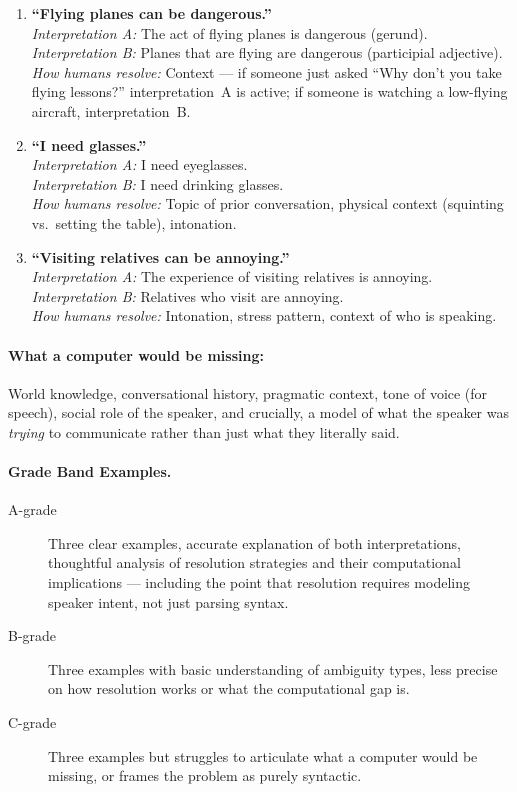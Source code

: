 \begin{enumerate}
    \item \textbf{``Flying planes can be dangerous.''}\\
    \emph{Interpretation A:} The act of flying planes is dangerous (gerund).\\
    \emph{Interpretation B:} Planes that are flying are dangerous (participial adjective).\\
    \emph{How humans resolve:} Context --- if someone just asked ``Why don't you take flying lessons?'' interpretation~A is active; if someone is watching a low-flying aircraft, interpretation~B.

    \item \textbf{``I need glasses.''}\\
    \emph{Interpretation A:} I need eyeglasses.\\
    \emph{Interpretation B:} I need drinking glasses.\\
    \emph{How humans resolve:} Topic of prior conversation, physical context (squinting vs.\ setting the table), intonation.

    \item \textbf{``Visiting relatives can be annoying.''}\\
    \emph{Interpretation A:} The experience of visiting relatives is annoying.\\
    \emph{Interpretation B:} Relatives who visit are annoying.\\
    \emph{How humans resolve:} Intonation, stress pattern, context of who is speaking.
\end{enumerate}

\paragraph{What a computer would be missing:} World knowledge, conversational history, pragmatic context, tone of voice (for speech), social role of the speaker, and crucially, a model of what the speaker was \emph{trying} to communicate rather than just what they literally said.

\paragraph{Grade Band Examples.}

\begin{description}
    \item[A-grade] Three clear examples, accurate explanation of both interpretations, thoughtful analysis of resolution strategies and their computational implications --- including the point that resolution requires modeling speaker intent, not just parsing syntax.

    \item[B-grade] Three examples with basic understanding of ambiguity types, less precise on how resolution works or what the computational gap is.

    \item[C-grade] Three examples but struggles to articulate what a computer would be missing, or frames the problem as purely syntactic.
\end{description}


